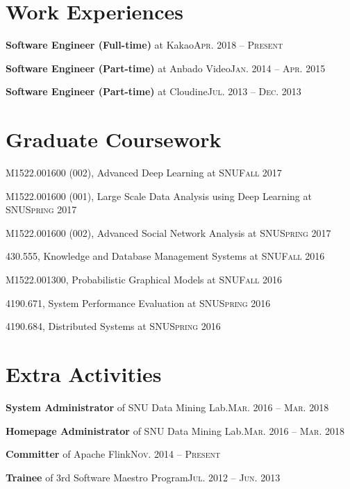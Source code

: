 \documentclass[11pt,a4paper]{article}
\renewenvironment{itemize}{
  \begin{list}{}{
    \setlength{\leftmargin}{1.5em}
    \setlength{\itemsep}{0.5em}
    \setlength{\parskip}{0pt}
    \setlength{\parsep}{0.25em}
  }
}{
  \end{list}
}
\begin{document}
\section*{Work Experiences}
\begin{itemize}
	\setlength\itemsep{0.1em}
  \item \textbf{Software Engineer (Full-time)} at Kakao\hfill\textsc{Apr. 2018 -- Present}
  \item \textbf{Software Engineer (Part-time)} at Anbado Video\hfill\textsc{Jan. 2014 -- Apr. 2015}
  \item \textbf{Software Engineer (Part-time)} at Cloudine\hfill\textsc{Jul. 2013 -- Dec. 2013}
\end{itemize}

\section*{Graduate Coursework}
\begin{itemize}
	\setlength\itemsep{0.1em}
  \item M1522.001600 (002), Advanced Deep Learning at SNU\hfill\textsc{Fall 2017}
	\item M1522.001600 (001), Large Scale Data Analysis using Deep Learning at SNU\hfill\textsc{Spring 2017}
	\item M1522.001600 (002), Advanced Social Network Analysis at SNU\hfill\textsc{Spring 2017}
	\item 430.555, Knowledge and Database Management Systems at SNU\hfill\textsc{Fall 2016}
	\item M1522.001300, Probabilistic Graphical Models at SNU\hfill\textsc{Fall 2016}
	\item 4190.671, System Performance Evaluation at SNU\hfill\textsc{Spring 2016}
	\item 4190.684, Distributed Systems at SNU\hfill\textsc{Spring 2016}
\end{itemize}

\section*{Extra Activities}
\begin{itemize}
	\setlength\itemsep{0.1em}
  \item \textbf{System Administrator} of SNU Data Mining Lab.\hfill\textsc{Mar. 2016 -- Mar. 2018}
  \item \textbf{Homepage Administrator} of SNU Data Mining Lab.\hfill\textsc{Mar. 2016 -- Mar. 2018}
  \item \textbf{Committer} of Apache Flink\hfill\textsc{Nov. 2014 -- Present}
  \item \textbf{Trainee} of 3rd Software Maestro Program\hfill\textsc{Jul. 2012 -- Jun. 2013}
\end{itemize}
\end{document}
